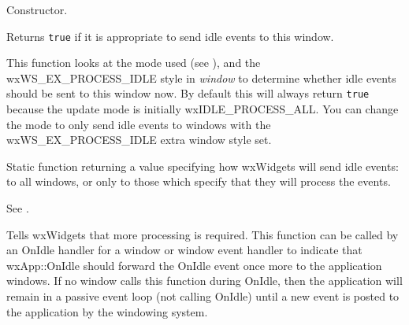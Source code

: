 \label{wxidleeventctor}


Constructor.

\label{wxidleeventcansend}


Returns {\tt true} if it is appropriate to send idle events to
this window.

This function looks at the mode used (see ),
and the wxWS\_EX\_PROCESS\_IDLE style in {\it window} to determine whether idle events should be sent to
this window now. By default this will always return {\tt true} because
the update mode is initially wxIDLE\_PROCESS\_ALL. You can change the mode
to only send idle events to windows with the wxWS\_EX\_PROCESS\_IDLE extra window style set.



\label{wxidleeventgetmode}


Static function returning a value specifying how wxWidgets
will send idle events: to all windows, or only to those which specify that they
will process the events.

See .

\label{wxidleeventrequestmore}


Tells wxWidgets that more processing is required. This function can be called by an OnIdle
handler for a window or window event handler to indicate that wxApp::OnIdle should
forward the OnIdle event once more to the application windows. If no window calls this function
during OnIdle, then the application will remain in a passive event loop (not calling OnIdle) until a
new event is posted to the application by the windowing system.



\label{wxidleeventmorerequested}

